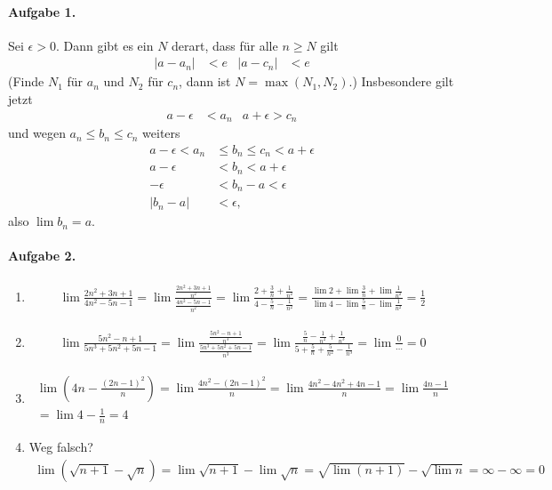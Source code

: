 \documentclass{article}
\begin{document}
\paragraph{Aufgabe 1.} Sei $\epsilon > 0$. Dann gibt es ein $N$ derart, dass für alle $n \geq N$ gilt
\begin{align*}
    |a - a_n| &< e & |a - c_n| &< e
\end{align*}
(Finde $N_1$ für $a_n$ und $N_2$ für $c_n$, dann ist $N = \max(N_1, N_2)$.) Insbesondere gilt jetzt
\begin{align*}
    a - \epsilon &< a_n &  a + \epsilon > c_n
\end{align*}
und wegen $a_n \leq b_n \leq c_n$ weiters
\begin{align*}
    a - \epsilon < a_n &\leq b_n \leq c_n < a + \epsilon \\
    a - \epsilon &< b_n < a + \epsilon \\
    -\epsilon &< b_n - a < \epsilon \\
    |b_n - a| &< \epsilon,
\end{align*}
also $\lim b_n = a$.

\paragraph{Aufgabe 2.}
\begin{enumerate}
    \item \begin{align*}
        \lim \frac{2n^2 + 3n + 1}{4n^2 - 5n - 1} = \lim \frac{\frac{2n^2 + 3n + 1}{n^2}}{\frac{4n^2 - 5n - 1}{n^2}} = \lim \frac{2 + \frac{3}{n} + \frac{1}{n^2}}{4 - \frac{5}{n} - \frac{1}{n^2}} = \frac{\lim 2 + \lim \frac{3}{n} + \lim \frac{1}{n^2}}{\lim 4 - \lim \frac{5}{n} - \lim \frac{1}{n^2}} = \frac{1}{2}
    \end{align*}

    \item \begin{align*}
        \lim \frac{5n^2 - n + 1}{5n^3 + 5n^2 + 5n - 1} = \lim\frac{\frac{5n^2 - n + 1}{n^3}}{\frac{5n^3 + 5n^2 + 5n - 1}{n^3}} = \lim\frac{\frac{5}{n} - \frac{1}{n^2} + \frac{1}{n^3}}{5 + \frac{5}{n} + \frac{5}{n^2} - \frac{1}{n^3}} = \lim \frac{0}{\cdots} = 0
    \end{align*}

    \item \begin{align*}
        \lim \left(4n - \frac{(2n - 1)^2}{n}\right) = \lim \frac{4n^2 - (2n - 1)^2}{n} = \lim \frac{4n^2 - 4n^2 + 4n - 1}{n} = \lim \frac{4n - 1}{n} \\
        = \lim 4 - \frac{1}{n} = 4
    \end{align*}

    \item Weg falsch?
    \begin{align*}
        \lim \left(\sqrt{n  + 1} - \sqrt{n}\right) = \lim \sqrt{n + 1} - \lim \sqrt{n} = \sqrt{\lim (n + 1)} - \sqrt{\lim n} = \infty - \infty = 0
    \end{align*}
\end{enumerate}
\end{document}
